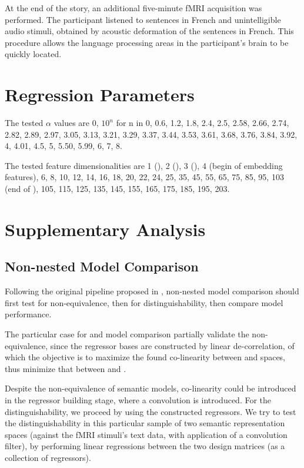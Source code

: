 At the end of the story, an additional five-minute fMRI acquisition was performed. The participant listened to sentences in French and unintelligible audio stimuli, obtained by acoustic deformation of the sentences in French. This procedure allows the language processing areas in the participant's brain to be quickly located.


\section{Regression Parameters}
\label{appsubsec:regressionparameters}

The tested \(\alpha\) values are 0, \(10^n\) for n in 0, 0.6, 1.2, 1.8, 2.4, 2.5, 2.58, 2.66, 2.74, 2.82, 2.89, 2.97, 3.05, 3.13, 3.21, 3.29, 3.37, 3.44, 3.53, 3.61, 3.68, 3.76, 3.84, 3.92, 4, 4.01, 4.5, 5, 5.50, 5.99, 6, 7, 8.

The tested feature dimensionalities are  1 (),   2 (),   3 (),   4 (begin of embedding features),   6,   8,  10,  12,  14,  16,  18,  20,  22,
        24,  25,  35,  45,  55,  65,  75,  85,  95, 103 (end of  ), 105,  115, 125, 135,
       145, 155, 165, 175, 185, 195, 203.



\section{Supplementary Analysis}
\subsection{Non-nested Model Comparison} 
\label{appsubsec:nonnestedcompmeth}
Following the original pipeline proposed in \cite{merkleTestingNonnestedStructural2016}, non-nested model comparison should first test for non-equivalence, then for distinguishability, then compare model performance. 

The particular case for  and  model comparison partially validate the non-equivalence, since the regressor bases are constructed by linear de-correlation, of which the objective is to maximize the found co-linearity between  and  spaces, thus minimize that between  and .

Despite the non-equivalence of semantic models, co-linearity could be introduced in the regressor building stage, where a convolution is introduced. For the distinguishability, we proceed by using the constructed regressors. We try to test the distinguishability in this particular sample of two semantic representation spaces (against the fMRI stimuli's text data, with application of a convolution filter), by performing linear regressions between the two design matrices (as a collection of regressors). 

